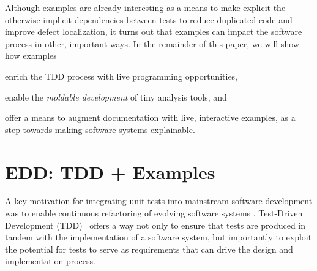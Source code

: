 \documentclass[sigplan,anonymous,review,10pt]{acmart}
\begin{document}
Although examples are already interesting as a means to make explicit the otherwise implicit dependencies between tests to reduce duplicated code and improve defect localization, it turns out that examples can impact the software process in other, important ways.
In the remainder of this paper, we will show how examples
\begin{inparaenum}[(i)]
	\item enrich the TDD process with live programming opportunities,
	\item enable the \emph{moldable development} of tiny analysis tools, and
	\item offer a means to augment documentation with live, interactive examples, as a step towards making software systems explainable.
\end{inparaenum}

\section{EDD: TDD + Examples}\label{sec:edd}

A key motivation for integrating unit tests into mainstream software development was to enable continuous refactoring of evolving software systems \cite{Beck00a}.
Test-Driven Development (TDD)~\cite{Beck03a} offers a way not only to ensure that tests are produced in tandem with the implementation of a software system, but importantly to exploit the potential for tests to serve as requirements that can drive the design and implementation process.
\end{document}
